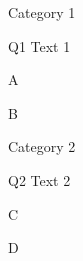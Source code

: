 \documentclass{article}
\begin{document}
\begin{quiz}{Category 1}
\begin{multi}{Q1}
Text 1
\item* A
\item B
\end{multi}
\end{quiz}
\begin{quiz}{Category 2}
\begin{multi}{Q2}
Text 2
\item* C
\item D
\end{multi}
\end{quiz}
\end{document}
